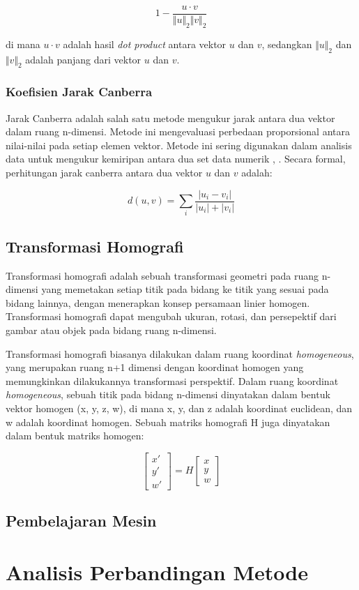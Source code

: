 \begin{equation}
	1-\frac{u\cdot v}{\Vert u\Vert_2\Vert v\Vert_2}
\end{equation}

\noindent di mana $u\cdot v$ adalah hasil \emph{dot product} antara vektor $u$ dan $v$, sedangkan $\Vert u\Vert_2$ dan $\Vert v\Vert_2$ adalah panjang dari vektor $u$ dan $v$.

\subsubsection{Koefisien Jarak Canberra}
Jarak Canberra adalah salah satu metode mengukur jarak antara dua vektor dalam ruang n-dimensi. Metode ini mengevaluasi perbedaan proporsional antara nilai-nilai pada setiap elemen vektor. Metode ini sering digunakan dalam analisis data untuk mengukur kemiripan antara dua set data numerik \cite{clusteringSumayiaAlAnazi}, \cite{sneath1973numerical}. Secara formal, perhitungan jarak canberra antara dua vektor $u$ dan $v$ adalah:

\begin{equation}
	d(u,v)=\sum_i\frac{\left | u_i-v_i \right |}{\left | u_i \right |+\left | v_i \right |}
\end{equation}

\subsection{Transformasi Homografi}
Transformasi homografi adalah sebuah transformasi geometri pada ruang n-dimensi yang memetakan setiap titik pada bidang ke titik yang sesuai pada bidang lainnya, dengan menerapkan konsep persamaan linier homogen. Transformasi homografi dapat mengubah ukuran, rotasi, dan persepektif dari gambar atau objek pada bidang ruang n-dimensi.

Transformasi homografi biasanya dilakukan dalam ruang koordinat \emph{homogeneous}, yang merupakan ruang n+1 dimensi dengan koordinat homogen yang memungkinkan dilakukannya transformasi perspektif. Dalam ruang koordinat \emph{homogeneous}, sebuah titik pada bidang n-dimensi dinyatakan dalam bentuk vektor homogen (x, y, z, w), di mana x, y, dan z adalah koordinat euclidean, dan w adalah koordinat homogen. Sebuah matriks homografi H juga dinyatakan dalam bentuk matriks homogen:

\begin{equation}
	\begin{bmatrix}
		x'\\ 
		y'\\ 
		w'
		\end{bmatrix}=H\begin{bmatrix} 
		x\\ 
		y\\ 
		w
		\end{bmatrix}
\end{equation}

\subsection{Pembelajaran Mesin}


\section{Analisis Perbandingan Metode}